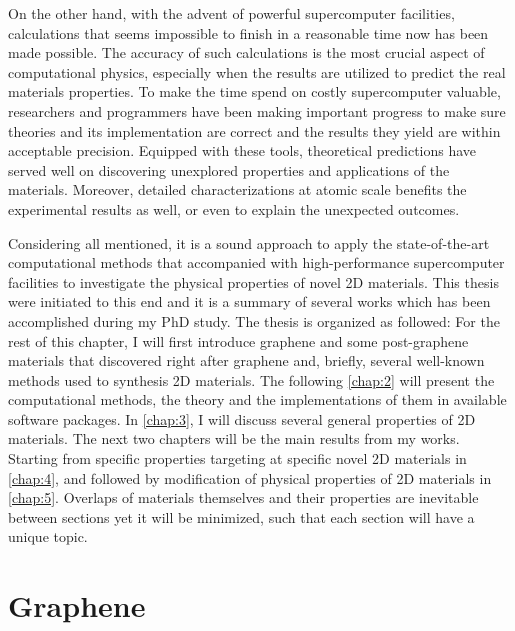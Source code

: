 On the other hand, with the advent of powerful supercomputer facilities, calculations that seems impossible to finish in a reasonable time now has been made possible. The accuracy of such calculations is the most crucial aspect of computational physics, especially when the results are utilized to predict the real materials properties. To make the time spend on costly supercomputer valuable, researchers and programmers have been making important progress to make sure theories and its implementation are correct and the results they yield are within acceptable precision. Equipped with these tools, theoretical predictions have served well on discovering unexplored properties and applications of the materials. Moreover, detailed characterizations at atomic scale benefits the experimental results as well, or even to explain the unexpected outcomes.

Considering all mentioned, it is a sound approach to apply the state-of-the-art computational methods that accompanied with high-performance supercomputer facilities to investigate the physical properties of novel 2D materials. This thesis were initiated to this end and it is a summary of several works which has been accomplished during my PhD study. The thesis is organized as followed: For the rest of this chapter, I will first introduce graphene and some post-graphene materials that discovered right after graphene and, briefly, several well-known methods used to synthesis 2D materials. The following \autoref{chap:2} will present the computational methods, the theory and the implementations of them in available software packages. In \autoref{chap:3}, I will discuss several general properties of 2D materials. The next two chapters will be the main results from my works. Starting from specific properties targeting at specific novel 2D materials in \autoref{chap:4}, and followed by modification of physical properties of 2D materials in \autoref{chap:5}. Overlaps of materials themselves and their properties are inevitable between sections yet it will be minimized, such that each section will have a unique topic. 


\section{Graphene}


